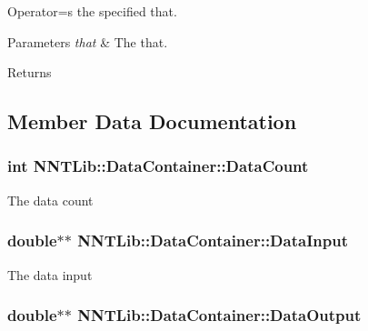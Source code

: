 Operator=s the specified that. 


\begin{DoxyParams}{Parameters}
{\em that} & The that.\\
\hline
\end{DoxyParams}
\begin{DoxyReturn}{Returns}

\end{DoxyReturn}


\subsection{Member Data Documentation}
\hypertarget{class_n_n_t_lib_1_1_data_container_aa90b71e48e7eb8ff3fe9f42bd4c57071}{}
\subsubsection[{Data\+Count}]{\setlength{\rightskip}{0pt plus 5cm}int N\+N\+T\+Lib\+::\+Data\+Container\+::\+Data\+Count}\label{class_n_n_t_lib_1_1_data_container_aa90b71e48e7eb8ff3fe9f42bd4c57071}


The data count 

\hypertarget{class_n_n_t_lib_1_1_data_container_a15c14ea2246df3d12cfaf5fe822d479a}{}
\subsubsection[{Data\+Input}]{\setlength{\rightskip}{0pt plus 5cm}double$\ast$$\ast$ N\+N\+T\+Lib\+::\+Data\+Container\+::\+Data\+Input}\label{class_n_n_t_lib_1_1_data_container_a15c14ea2246df3d12cfaf5fe822d479a}


The data input 

\hypertarget{class_n_n_t_lib_1_1_data_container_adcbb3f80557abf9f8fb8f53ea648a3ad}{}
\subsubsection[{Data\+Output}]{\setlength{\rightskip}{0pt plus 5cm}double$\ast$$\ast$ N\+N\+T\+Lib\+::\+Data\+Container\+::\+Data\+Output}\label{class_n_n_t_lib_1_1_data_container_adcbb3f80557abf9f8fb8f53ea648a3ad}


